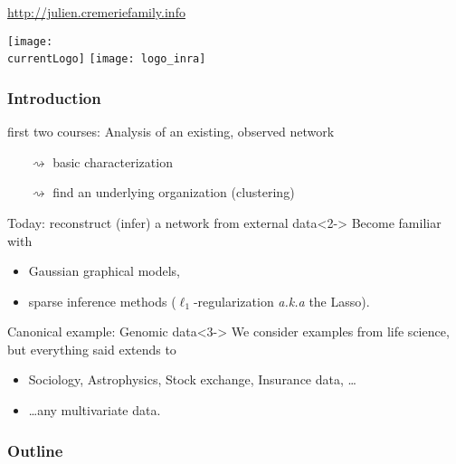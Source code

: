 \documentclass{beamer}\usepackage[]{graphicx}\usepackage[]{color}
\title{\currentCourse}
\subtitle{\huge\currentChapter\normalsize}
\institute{\currentInstitute}
\date{Autumn semester 2017}
\def\currentLogo{logo_ensai}
\newcommand{\dotitlepage}{%
  \begin{frame}
    \titlepage
    \vfill
    \begin{center}
        \scriptsize\url{http://julien.cremeriefamily.info}
    \end{center}
    \vfill
    \texttt{[image: \\currentLogo]}\hfill
    \texttt{[image: logo\_inra]}
  \end{frame}
}
\begin{document}
\dotitlepage

\begin{frame}
  \frametitle{Introduction}

  \begin{block}{first two courses: \alert{Analysis of an existing, observed network}}
    \vspace{-.25cm}  
    \begin{itemize}
      \item[$\rightsquigarrow$] \alert{basic characterization}
      \item[$\rightsquigarrow$] \alert{find an underlying organization} (clustering)
    \end{itemize}
  \end{block}

  \begin{block}{Today: \alert{reconstruct (infer) a network from external data}}<2->
    Become familiar with
    \begin{itemize}
      \item Gaussian graphical models,
      \item sparse inference methods ($\ell_1$-regularization \textit{a.k.a} the \alert{Lasso}).
    \end{itemize}
  \end{block}

  \begin{block}{Canonical example: \alert{Genomic data}}<3->
    We consider examples from life science, but everything said extends to
    \begin{itemize}
      \item Sociology, Astrophysics, Stock exchange, Insurance data, \dots
      \item \dots any multivariate data. 
    \end{itemize}
  \end{block}

\end{frame}



\begin{frame}
  \frametitle{Outline}
  \tableofcontents
\end{frame}




\end{document}
